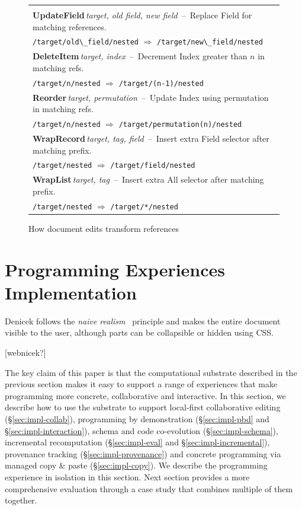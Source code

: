\documentclass[sigconf,anonymous,screen]{acmart}
\begin{document}
\begin{figure}
\newcommand{\tttablecol}[5]{
\small{\bfseries #1}\;\,\footnotesize\textit{#2}\,\; --\,\; #5\\[-0.1em]
\quad \footnotesize #3 \;\;$\Rightarrow$\;\; #4 \\[0.3em]
}
\begin{tabular}{|l|}
\hline
\\[-1em]
\tttablecol{UpdateField}{target, old field, new field}{\Verb|/target/old\_field/nested|}{\Verb|/target/new\_field/nested|}
  {Replace Field for matching references.}
\tttablecol{DeleteItem}{target, index}{\Verb|/target/n/nested|}{\Verb|/target/(n-1)/nested|}
  {Decrement Index greater than $n$ in matching refs.}
\tttablecol{Reorder}{target, permutation}{\Verb|/target/n/nested|}{\Verb|/target/permutation(n)/nested|}
  {Update Index using permutation in matching refs.}
\tttablecol{WrapRecord}{target, tag, field}{\Verb|/target/nested|}{\Verb|/target/field/nested|}
  {Insert extra Field selector after matching prefix.}
\tttablecol{WrapList}{target, tag}{\Verb|/target/nested|}{\Verb|/target/*/nested|}
  {Insert extra All selector after matching prefix.}
\hline
\end{tabular}
\vspace{-0.5em}
\caption{How document edits transform references}
\label{fig:updates}
\vspace{-1em}
\end{figure}



\section{Programming Experiences Implementation}
\label{sec:impl}

Denicek follows the \emph{naive realism}~\cite{disessa-1986-boxer} principle and makes the entire
document visible to the user, although parts can be collapsible or hidden using CSS.

[webnicek?]

The key claim of this paper is that the computational substrate described in the previous
section makes it easy to support a range of experiences that make programming more concrete,
collaborative and interactive. In this section, we describe how to use the substrate to support
local-first collaborative editing (\S\ref{sec:impl-collab}), programming by
demonstration (\S\ref{sec:impl-pbd} and \S\ref{sec:impl-interaction}),
schema and code co-evolution (\S\ref{sec:impl-schema}), incremental recomputation
(\S\ref{sec:impl-eval} and \S\ref{sec:impl-incremental}), provenance tracking (\S\ref{sec:impl-provenance})
and concrete programming via managed copy \& paste (\S\ref{sec:impl-copy}).
We describe the programming experience in isolation in this section. Next section provides a
more comprehensive evaluation through a case study that combines multiple of them together.
\end{document}
